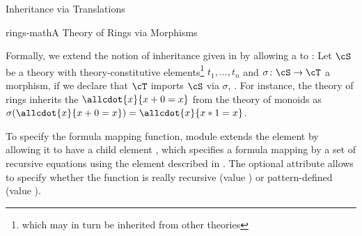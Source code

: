 \begin{omgroup}[id=complex-theories,short=Complex Theories,
                            creators=miko,contributors=frabe]
\begin{omgroup}[id=morphisms]{Inheritance via Translations}
\begin{module}[id=morphisms]
\begin{myfig}{rings-math}{A Theory of Rings via Morphisms}
\end{myfig}

\begin{omtext}
Formally, we extend the notion of inheritance given in {} by allowing a
{} to : Let $\cS$ be a theory with theory-constitutive
elements\footnote{which may in turn be inherited from other theories} $t_1,\ldots,t_n$ and
$\sigma\colon\cS\to\cT$ a morphism, if we declare that $\cT$ imports $\cS$ via $\sigma$,
. For instance, the theory of rings inherits the {}
$\allcdot{x}{x+0=x}$ from the theory of monoids as
$\sigma(\allcdot{x}{x+0=x})=\allcdot{x}{x*1=x}$.
\end{omtext}

\begin{definition}[id=morphism.def]
  To specify the formula mapping function, module {} extends the
  {} element by allowing it to have a child element {},
  which specifies a formula mapping by a set of recursive equations using the
  {} element described in {}. The optional attribute
  {} allows to specify whether the function is really recursive
  (value {}) or pattern-defined (value
  {}).
\end{definition}


\end{module}
\end{omgroup}
\end{omgroup}
